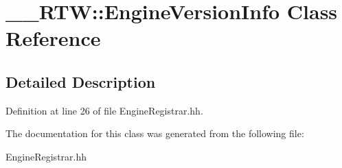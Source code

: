 \section{\-\_\-\-\_\-\-R\-T\-W\-:\-:Engine\-Version\-Info Class Reference}
\label{class____RTW_1_1EngineVersionInfo}


\subsection{Detailed Description}


Definition at line 26 of file Engine\-Registrar.\-hh.



The documentation for this class was generated from the following file\-:\begin{DoxyCompactItemize}
\item 
Engine\-Registrar.\-hh\end{DoxyCompactItemize}
